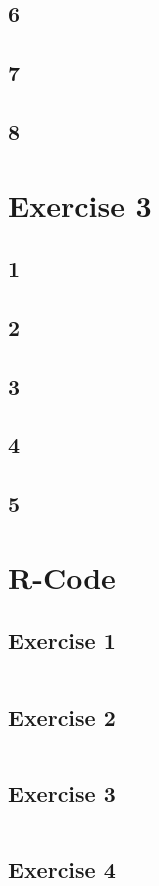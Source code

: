 \documentclass{article}
\begin{document}
    \subsection*{6}
    \subsection*{7}
    \subsection*{8}

  \section*{Exercise 3}
    \subsection*{1}
    \subsection*{2}
    \subsection*{3}
    \subsection*{4}
    \subsection*{5}
    
  \section{R-Code}
    \subsection{Exercise 1}\label{sec:RE1}
      \begin{lstlisting}[language=R]
      \end{lstlisting}
    \subsection{Exercise 2}\label{sec:RE2}
      \begin{lstlisting}[language=R]
      \end{lstlisting}
    \subsection{Exercise 3}\label{sec:RE3}
      \begin{lstlisting}[language=R]
      \end{lstlisting}
    \subsection{Exercise 4}\label{sec:RE4}
      \begin{lstlisting}[language=R]
      \end{lstlisting}
\end{document}
